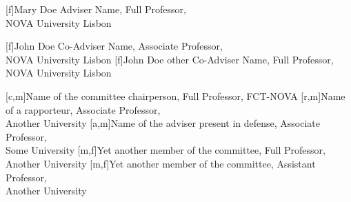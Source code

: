 


[f]{{Mary Doe Adviser Name, Full Professor, \\NOVA University Lisbon}}

[f]{John Doe Co-Adviser Name, Associate Professor, \\NOVA University Lisbon}
[f]{John Doe other Co-Adviser Name, Full Professor, \\NOVA University Lisbon}

[c,m]{Name of the committee chairperson, Full Professor, FCT-NOVA}
[r,m]{Name of a rapporteur, Associate Professor, \\Another University}
[a,m]{Name of the adviser present in defense, Associate Professor, \\Some University}
[m,f]{Yet another member of the committee, Full Professor, \\Another University}
[m,f]{Yet another member of the committee, Assistant Professor, \\Another University}
